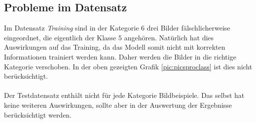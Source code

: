 \subsection{Probleme im Datensatz}
Im Datensatz \textit{Training} sind in der Kategorie 6 drei Bilder fälschlicherweise eingeordnet, die eigentlich der Klasse 5 angehören. Natürlich hat dies Auswirkungen auf das Training, da das Modell somit nicht mit korrekten Informationen trainiert werden kann. Daher werden die Bilder in die richtige Kategorie verschoben. In der oben gezeigten Grafik \ref{pic:picsproclass} ist dies nicht berücksichtigt.\\
\\
Der Testdatensatz enthält nicht für jede Kategorie Bildbeispiele. Das selbst hat keine weiteren Auswirkungen, sollte aber in der Auswertung der Ergebnisse berücksichtigt werden.

